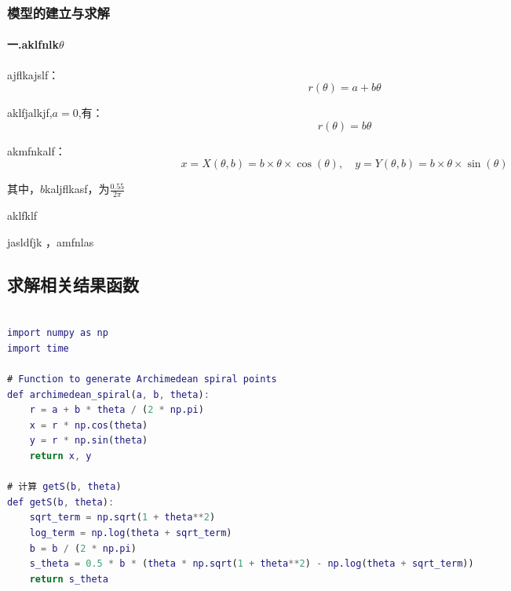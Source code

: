 \documentclass[bwprint,a4paper]{../../../Cls/Thesis/CUMCM/CUMCM} %
\begin{document}
\subsubsection{模型的建立与求解}
\paragraph{\textbf{一.aklfnlk$\theta$}} \hspace*{\fill} \par
ajflkajslf\cite{bib:2}：
\begin{equation} r(\theta) = a + b \theta
\end{equation}
\par
aklfjalkjf,$a=0$,有：
\begin{equation} r(\theta) = b \theta
\end{equation}
\par
akmfnkalf\cite{bib:2}：
\begin{equation}\label{3} x=X(\theta,b) = b\times\theta\times \cos(\theta), \quad y=Y(\theta,b) = b\times\theta \times \sin(\theta)
\end{equation}
\par 其中，$b$kaljflkasf，为$\frac{0.55}{2 \pi}$
\par
aklfklf
\newpage
\begin{thebibliography}{9}%
    jasldfjk
，amfnlas
\end{thebibliography}
\newpage
\begin{appendices}
    \section{求解相关结果函数}
    \begin{lstlisting}[language=matlab, basicstyle = \ttfamily,breaklines = true]

import numpy as np
import time

# Function to generate Archimedean spiral points
def archimedean_spiral(a, b, theta):
    r = a + b * theta / (2 * np.pi)
    x = r * np.cos(theta)
    y = r * np.sin(theta)
    return x, y

# 计算 getS(b, theta)
def getS(b, theta):
    sqrt_term = np.sqrt(1 + theta**2)
    log_term = np.log(theta + sqrt_term)
    b = b / (2 * np.pi)
    s_theta = 0.5 * b * (theta * np.sqrt(1 + theta**2) - np.log(theta + sqrt_term))
    return s_theta
    \end{lstlisting}


\end{appendices}
\end{document}
